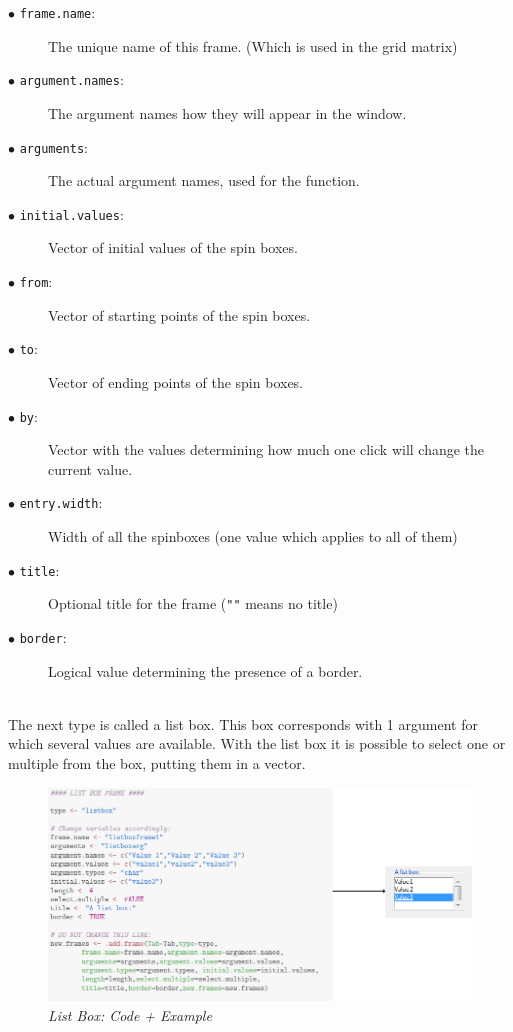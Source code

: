\documentclass[a4paper]{article}\usepackage[]{graphicx}\usepackage[]{color}
\begin{document}
\begin{description}
  \item[$\bullet$ \texttt{frame.name}:] The unique name of this frame. (Which is used in the grid matrix)
  \item[$\bullet$ \texttt{argument.names}:] The argument names how they will
  appear in the window.  
  \item[$\bullet$ \texttt{arguments}:] The actual argument names, used for the
  function.
  \item[$\bullet$ \texttt{initial.values}:] Vector of initial values of the
  spin boxes.
  \item[$\bullet$ \texttt{from}:] Vector of starting points of the spin boxes.
  \item[$\bullet$ \texttt{to}:] Vector of ending points of the spin boxes.
  \item[$\bullet$ \texttt{by}:] Vector with the values determining how much one
  click will change the current value.
  \item[$\bullet$ \texttt{entry.width}:] Width of all the spinboxes (one value
  which applies to all of them)
  \item[$\bullet$ \texttt{title}:] Optional title for the frame (\verb|""| means no title)
  \item[$\bullet$ \texttt{border}:] Logical value determining the presence of a
  border.   
  
\end{description}

\\
\noindent The next type is called a list box. This box corresponds with 1
argument for which several values are available. With the list box it is possible to select
one or multiple from the box, putting them in a vector.
\begin{figure}[H]
\centering
\includegraphics[scale=0.5]{figures/listbox.png}
\caption{{\it List Box: Code + Example}
\label{listbox}}
\end{figure}
\end{document}
